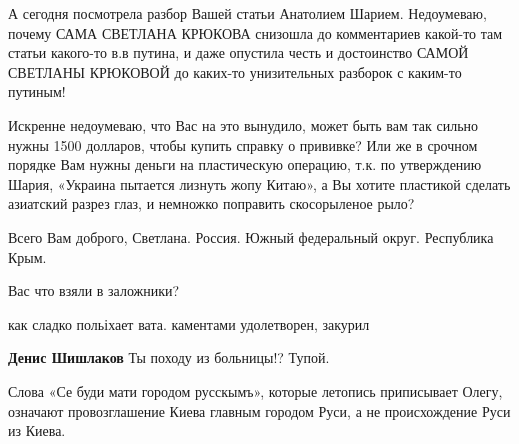 \begin{itemize}
А сегодня посмотрела разбор Вашей статьи Анатолием Шарием. Недоумеваю, почему
САМА СВЕТЛАНА КРЮКОВА снизошла до комментариев какой-то там статьи какого-то
в.в путина, и даже опустила честь и достоинство САМОЙ СВЕТЛАНЫ КРЮКОВОЙ до
каких-то унизительных разборок с каким-то путиным! 

Искренне недоумеваю, что Вас на это вынудило, может быть вам так сильно нужны
1500 долларов, чтобы купить справку о прививке? Или же в срочном порядке Вам
нужны деньги на пластическую операцию, т.к. по утверждению Шария, «Украина
пытается лизнуть жопу Китаю», а Вы хотите пластикой сделать азиатский разрез
глаз, и немножко поправить скосорыленое рыло? 

Всего Вам доброго, Светлана.  Россия. Южный федеральный округ. Республика Крым.

 
Вас что взяли в заложники?

 
как сладко польіхает вата. каментами удолетворен, закурил \Smiley[1.0][yellow]

\begin{itemize}
 
\textbf{Денис Шишлаков} Ты походу из больницы!? Тупой.
\end{itemize}


Слова «Се буди мати городом русскымъ», которые летопись приписывает Олегу,
означают провозглашение Киева главным городом Руси, а не происхождение Руси из
Киева.

\begin{itemize}
 

\end{itemize}
\end{itemize}
